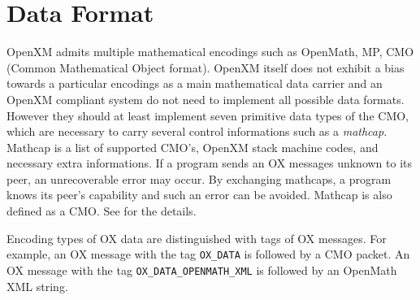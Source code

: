 
\section{Data Format}   

OpenXM admits multiple mathematical encodings such as OpenMath, MP, CMO
(Common Mathematical Object format).
OpenXM itself does not exhibit a bias towards a particular encodings 
as a main mathematical data carrier and an OpenXM compliant system do not need to
implement all possible data formats.
However  they should at least implement seven primitive 
data types of the CMO, which are necessary to 
carry several control informations such as a {\it mathcap}.
Mathcap is a list of supported CMO's, OpenXM stack machine codes, 
and necessary extra informations.
If a program sends an OX messages unknown to its peer, 
an unrecoverable error may occur. 
By exchanging mathcaps, a program knows its peer's capability 
and such an error can be avoided.
Mathcap is also defined as a CMO.
See \cite{noro-takayama} for the details.

Encoding types of OX data are distinguished with tags
of OX messages.
For example,
an OX message with the tag 
{\tt OX\_DATA} is followed by a CMO packet.
An OX message with the tag 
{\tt OX\_DATA\_OPENMATH\_XML} is followed by 
an OpenMath XML string.

